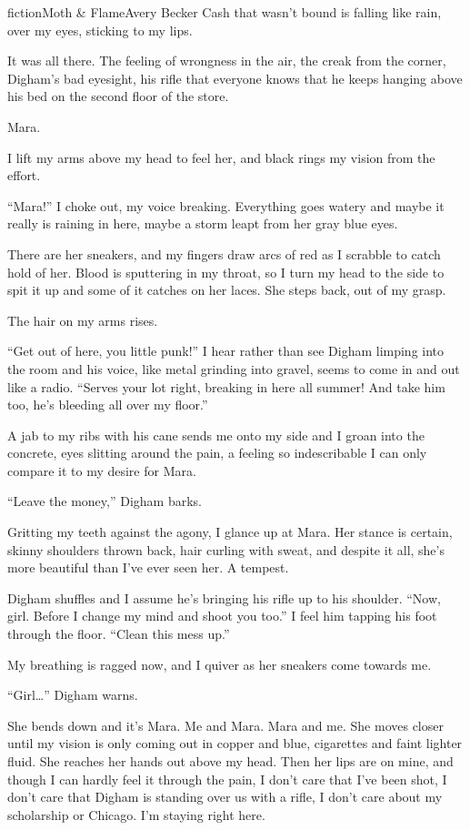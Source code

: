 \begin{prose}{fiction}{Moth \& Flame}{Avery Becker}
Cash that wasn't bound is falling like rain, over my eyes, sticking to my lips. \par
It was all there. The feeling of wrongness in the air, the creak from the corner, Digham's bad eyesight, his rifle that everyone knows that he keeps hanging above his bed on the second floor of the store. \par
Mara. \par
I lift my arms above my head to feel her, and black rings my vision from the effort. \par
“Mara!” I choke out, my voice breaking. Everything goes watery and maybe it really is raining in here, maybe a storm leapt from her gray blue eyes. \par
There are her sneakers, and my fingers draw arcs of red as I scrabble to catch hold of her. Blood is sputtering in my throat, so I turn my head to the side to spit it up and some of it catches on her laces. She steps back, out of my grasp. \par
The hair on my arms rises.\par
“Get out of here, you little punk!” I hear rather than see Digham limping into the room and his voice, like metal grinding into gravel, seems to come in and out like a radio. “Serves your lot right, breaking in here all summer! And take him too, he's bleeding all over my floor.” \par
A jab to my ribs with his cane sends me onto my side and I groan into the concrete, eyes slitting around the pain, a feeling so indescribable I can only compare it to my desire for Mara.\par
“Leave the money,” Digham barks. \par
Gritting my teeth against the agony, I glance up at Mara. Her stance is certain, skinny shoulders thrown back, hair curling with sweat, and despite it all, she's more beautiful than I've ever seen her. A tempest.\par
Digham shuffles and I assume he's bringing his rifle up to his shoulder. “Now, girl. Before I change my mind and shoot you too.” I feel him tapping his foot through the floor. “Clean this mess up.” \par
My breathing is ragged now, and I quiver as her sneakers come towards me.\par
“Girl…” Digham warns.\par
She bends down and it's Mara. Me and Mara. Mara and me. She moves closer until my vision is only coming out in copper and blue, cigarettes and faint lighter fluid. She reaches her hands out above my head. Then her lips are on mine, and though I can hardly feel it through the pain, I don't care that I've been shot, I don't care that Digham is standing over us with a rifle, I don't care about my scholarship or Chicago. I'm staying right here. \par

\end{prose}
